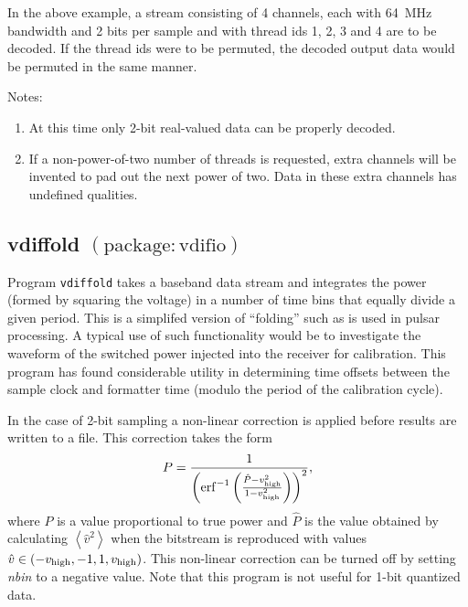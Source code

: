 In the above example, a stream consisting of 4 channels, each with 64~MHz bandwidth and 2 bits per sample and with thread ids 1, 2, 3 and 4 are to be decoded.
If the thread ids were to be permuted, the decoded output data would be permuted in the same manner.

\noindent
Notes:
\begin{enumerate}
\item At this time only 2-bit real-valued data can be properly decoded.
\item If a non-power-of-two number of threads is requested, extra channels will be invented to pad out the next power of two.
Data in these extra channels has undefined qualities.
\end{enumerate}





\subsection{vdiffold {\small $\mathrm{(package: vdifio)}$}} \label{sec:vdiffold}

Program {\tt vdiffold} takes a baseband data stream and integrates the power (formed by squaring the voltage) in a number of time bins that equally divide a given period.
This is a simplifed version of ``folding'' such as is used in pulsar processing.
A typical use of such functionality would be to investigate the waveform of the switched power injected into the receiver for calibration.
This program has found considerable utility in determining time offsets between the sample clock and formatter time (modulo the period of the calibration cycle).

In the case of 2-bit sampling a non-linear correction is applied before results are written to a file.
This correction takes the form
\begin{equation}
P = \frac{1}{\left({\rm erf}^{-1}\left(\frac{\hat{P} - v_{\rm high}^2}{1 - v_{\rm high}^2} \right)\right)^2},
\end{equation}
where $P$ is a value proportional to true power and $\hat{P}$ is the value obtained by calculating $\left<\hat{v}^2\right>$ when the bitstream is reproduced with values $\hat{v} \in ( -v_{\rm high}, -1, 1, v_{\rm high} )$. 
This non-linear correction can be turned off by setting {\em nbin} to a negative value.
Note that this program is not useful for 1-bit quantized data.

